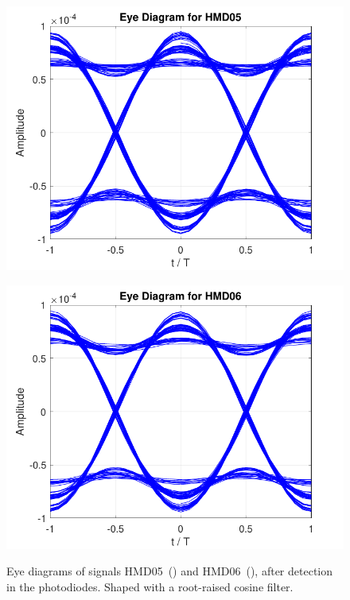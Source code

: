 \begin{figure}[H]
	\centering
	\begin{minipage}{0.45\textwidth}
		\centering
		\includegraphics[width=1\textwidth]		
		{./sdf/m_qam_system/figures/simulations/03_eNoise/HMD05_ed.pdf}
		\subcaption{}\label{fig:sim_eNoiseHmd05ed}
	\end{minipage}
	\begin{minipage}{0.45\textwidth}
		\centering
		\includegraphics[width=1\textwidth]
		{sdf/m_qam_system/figures/simulations/03_eNoise/HMD06_ed.pdf}
		\subcaption{}\label{fig:sim_eNoiseHmd06ed}
	\end{minipage}
	\caption{Eye diagrams of signals HMD05~() and 
		HMD06~(), after detection in the 
		photodiodes. Shaped with a root-raised cosine 
		filter.}\label{fig:sim_eNoiseHmd0506ed}
\end{figure}

